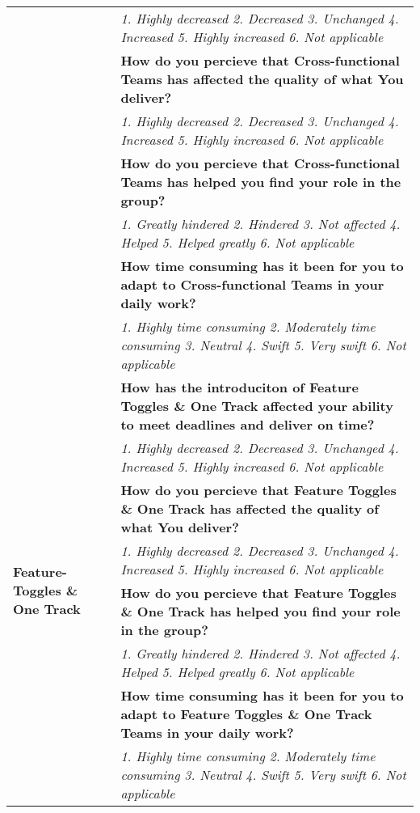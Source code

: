 \documentclass[final_report_innit.tex]{subfiles}
\begin{document}
\begin{center}
\begin{table}[h]
\begin{tabular}[t]{| p{4.5cm} | p{13cm} |}
	& \textit{1. Highly decreased 2. Decreased 3. Unchanged 4. Increased 5. Highly increased 6. Not applicable} \\ \cline{2-2}
	& \cellcolor{greyOdd}\textbf{How do you percieve that Cross-functional Teams has affected the quality of what You deliver?} \\
	& \textit{1. Highly decreased 2. Decreased 3. Unchanged 4. Increased 5. Highly increased 6. Not applicable} \\ \cline{2-2}
	& \cellcolor{greyOdd}\textbf{How do you percieve that Cross-functional Teams has helped you find your role in the group?} \\
	& \textit{1. Greatly hindered 2. Hindered 3. Not affected 4. Helped 5. Helped greatly 6. Not applicable} \\ \cline{2-2}
	& \cellcolor{greyOdd}\textbf{How time consuming has it been for you to adapt to Cross-functional Teams in your daily work?} \\
	& \textit{1. Highly time consuming 2. Moderately time consuming 3. Neutral 4. Swift 5. Very swift 6. Not applicable} \\
	\hline
	\multirow{10}{*}{\textbf{Feature-Toggles \& One Track}} & \cellcolor{greyOdd}\textbf{How has the introduciton of Feature Toggles \& One Track affected your ability to meet deadlines and deliver on time?} \\ 
	& \textit{1. Highly decreased 2. Decreased 3. Unchanged 4. Increased 5. Highly increased 6. Not applicable} \\ \cline{2-2}
	& \cellcolor{greyOdd}\textbf{How do you percieve that Feature Toggles \& One Track has affected the quality of what You deliver?} \\
	& \textit{1. Highly decreased 2. Decreased 3. Unchanged 4. Increased 5. Highly increased 6. Not applicable} \\ \cline{2-2}
	& \cellcolor{greyOdd}\textbf{How do you percieve that Feature Toggles \& One Track has helped you find your role in the group?} \\
	& \textit{1. Greatly hindered 2. Hindered 3. Not affected 4. Helped 5. Helped greatly 6. Not applicable} \\ \cline{2-2}
	& \cellcolor{greyOdd}\textbf{How time consuming has it been for you to adapt to Feature Toggles \& One Track Teams in your daily work?} \\
	& \textit{1. Highly time consuming 2. Moderately time consuming 3. Neutral 4. Swift 5. Very swift 6. Not applicable} \\

\end{tabular}
\end{table}
\end{center}
\end{document}
